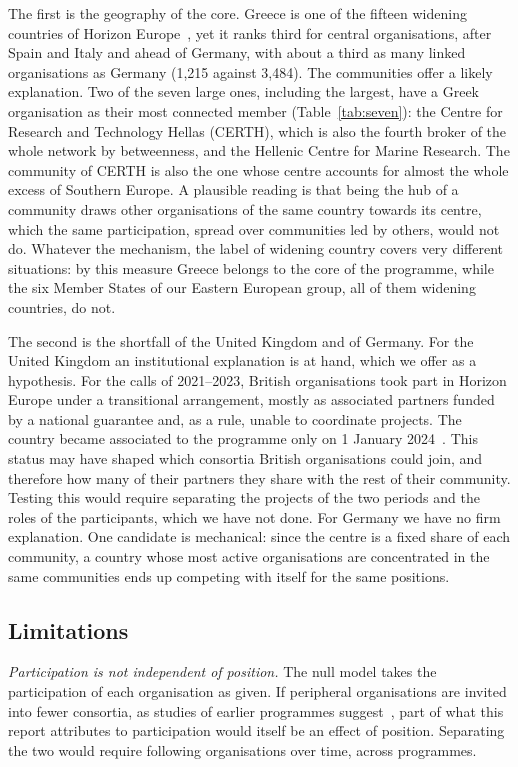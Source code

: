 \documentclass[sigchi]{acmart}
\begin{document}
The first is the geography of the core. Greece is one of the fifteen widening countries of Horizon Europe~\cite{widening}, yet it ranks third for central organisations, after Spain and Italy and ahead of Germany, with about a third as many linked organisations as Germany (1,215 against 3,484). The communities offer a likely explanation. Two of the seven large ones, including the largest, have a Greek organisation as their most connected member (Table~\ref{tab:seven}): the Centre for Research and Technology Hellas (CERTH), which is also the fourth broker of the whole network by betweenness, and the Hellenic Centre for Marine Research. The community of CERTH is also the one whose centre accounts for almost the whole excess of Southern Europe. A plausible reading is that being the hub of a community draws other organisations of the same country towards its centre, which the same participation, spread over communities led by others, would not do. Whatever the mechanism, the label of widening country covers very different situations: by this measure Greece belongs to the core of the programme, while the six Member States of our Eastern European group, all of them widening countries, do not.

The second is the shortfall of the United Kingdom and of Germany. For the United Kingdom an institutional explanation is at hand, which we offer as a hypothesis. For the calls of 2021--2023, British organisations took part in Horizon Europe under a transitional arrangement, mostly as associated partners funded by a national guarantee and, as a rule, unable to coordinate projects. The country became associated to the programme only on 1 January 2024~\cite{ukassociation}. This status may have shaped which consortia British organisations could join, and therefore how many of their partners they share with the rest of their community. Testing this would require separating the projects of the two periods and the roles of the participants, which we have not done. For Germany we have no firm explanation. One candidate is mechanical: since the centre is a fixed share of each community, a country whose most active organisations are concentrated in the same communities ends up competing with itself for the same positions.

\subsection{Limitations}

\emph{Participation is not independent of position.} The null model takes the participation of each organisation as given. If peripheral organisations are invited into fewer consortia, as studies of earlier programmes suggest~\cite{enger2018}, part of what this report attributes to participation would itself be an effect of position. Separating the two would require following organisations over time, across programmes.
\end{document}
